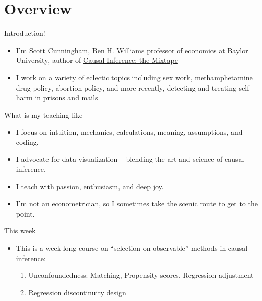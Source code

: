 \documentclass{beamer}
\begin{document}





\section{Overview}

\begin{frame}{Introduction!}

  \begin{itemize}
	\item I'm Scott Cunningham, Ben H. Williams professor of economics at Baylor University, author of \underline{Causal Inference: the Mixtape}
	\item I work on a variety of eclectic topics including sex work, methamphetamine drug policy, abortion policy, and more recently, detecting and treating self harm in prisons and mails
  \end{itemize}

\end{frame}


\begin{frame}{What is my teaching like}
    \begin{itemize}
        \item I focus on intuition, mechanics, calculations, meaning, assumptions, and coding.
        \item I advocate for data visualization – blending the art and science of causal inference.
        \item I teach with passion, enthusiasm, and deep joy.
        \item I'm not an econometrician, so I sometimes take the scenic route to get to the point.
    \end{itemize}
\end{frame}



\begin{frame}{This week}

  \begin{itemize}
    \item This is a week long course on ``selection on observable'' methods in causal inference: 
    	\begin{enumerate}
	\item Unconfoundedness: Matching, Propensity scores, Regression adjustment
	\item Regression discontinuity design
	\end{enumerate}
  \end{itemize}

\end{frame}
\end{document}
